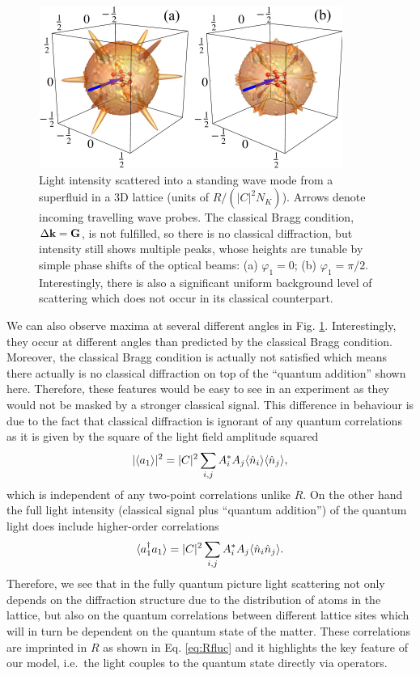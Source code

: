 \begin{figure}
  \centering
  \includegraphics[width=0.8\linewidth]{Ep1}
  \caption[Light Scattering Angular Distribution]{Light intensity
    scattered into a standing wave mode from a superfluid in a 3D
    lattice (units of $R/(|C|^2N_K)$). Arrows denote incoming
    travelling wave probes. The classical Bragg condition,
    $\Delta \mathbf{k} = \mathbf{G}$, is not fulfilled, so there is no classical
    diffraction, but intensity still shows multiple peaks, whose
    heights are tunable by simple phase shifts of the optical beams:
    (a) $\varphi_1=0$; (b) $\varphi_1=\pi/2$. Interestingly, there is
    also a significant uniform background level of scattering which
    does not occur in its classical counterpart. }
  \label{fig:scattering}
\end{figure}

We can also observe maxima at several different angles in
Fig. \ref{fig:scattering}. Interestingly, they occur at different
angles than predicted by the classical Bragg condition. Moreover, the
classical Bragg condition is actually not satisfied which means there
actually is no classical diffraction on top of the ``quantum
addition'' shown here. Therefore, these features would be easy to see
in an experiment as they would not be masked by a stronger classical
signal.  This difference in behaviour is due to the fact that
classical diffraction is ignorant of any quantum correlations as it is
given by the square of the light field amplitude squared
\begin{equation}
  |\langle a_1 \rangle|^2 = |C|^2 \sum_{i,j} A_i^*
  A_j \langle \hat{n}_i \rangle \langle \hat{n}_j \rangle,
\end{equation}
which is independent of any two-point correlations unlike $R$. On the
other hand the full light intensity (classical signal plus ``quantum
addition'') of the quantum light does include higher-order
correlations
\begin{equation}
  \langle a^\dagger_1 a_1 \rangle = |C|^2 \sum_{i,j} A_i^*
  A_j \langle \hat{n}_i \hat{n}_j \rangle.
\end{equation}
Therefore, we see that in the fully quantum picture light scattering
not only depends on the diffraction structure due to the distribution
of atoms in the lattice, but also on the quantum correlations between
different lattice sites which will in turn be dependent on the quantum
state of the matter. These correlations are imprinted in $R$ as shown
in Eq. \eqref{eq:Rfluc} and it highlights the key feature of our
model, i.e.~the light couples to the quantum state directly via
operators.

